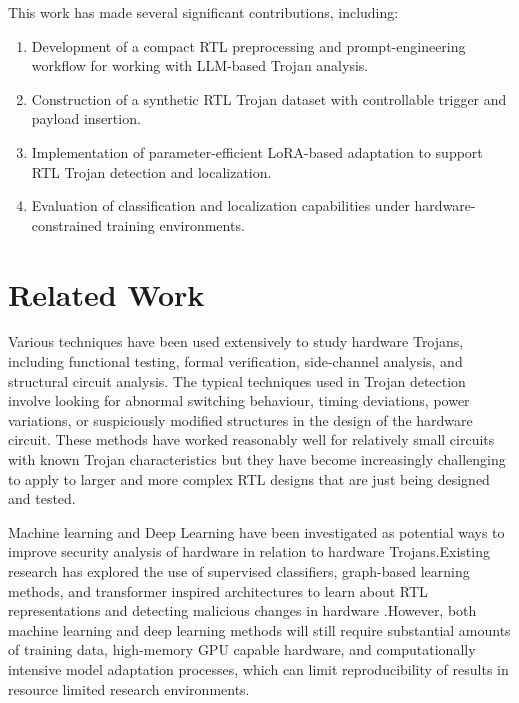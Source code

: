 \documentclass[conference]{IEEEtran}
\begin{document}
This work has made several significant contributions, including:

\begin{enumerate}
    \item Development of a compact RTL preprocessing and prompt-engineering workflow for working with LLM-based Trojan analysis.
    
    \item Construction of a synthetic RTL Trojan dataset with controllable trigger and payload insertion.
    
    \item Implementation of parameter-efficient LoRA-based adaptation to support RTL Trojan detection and localization.
    
    \item Evaluation of classification and localization capabilities under hardware-constrained training environments.
\end{enumerate}


\section{Related Work}
\label{sec:related_work}

Various techniques have been used extensively to study hardware Trojans, including functional testing, formal verification, side-channel analysis, and structural circuit analysis. The typical techniques used in Trojan detection involve looking for abnormal switching behaviour, timing deviations, power variations, or suspiciously modified structures in the design of the hardware circuit. These methods have worked reasonably well for relatively small circuits with known Trojan characteristics but they have become increasingly challenging to apply to larger and more complex RTL designs that are just being designed and tested.

Machine learning and Deep Learning have been investigated as potential ways to improve security analysis of hardware in relation to hardware Trojans.Existing research has explored the use of supervised classifiers, graph-based learning methods, and transformer inspired architectures to learn about RTL representations and detecting malicious changes in hardware \cite{hayashi2025mlht,wan2024rtl}.However, both machine learning and deep learning methods will still require substantial amounts of training data, high-memory GPU capable hardware, and computationally intensive model adaptation processes, which can limit reproducibility of results in resource limited research environments.
\end{document}
